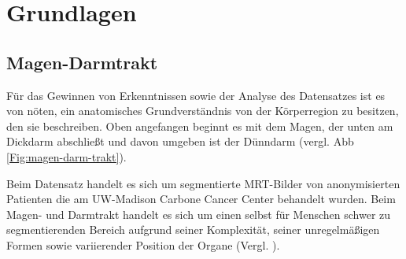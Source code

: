 \section{Grundlagen}\raggedbottom

\subsection{Magen-Darmtrakt}

Für das Gewinnen von Erkenntnissen sowie der Analyse des Datensatzes ist es von nöten, ein anatomisches Grundverständnis von der Körperregion zu besitzen, den sie beschreiben. Oben angefangen beginnt es mit dem Magen, der unten am Dickdarm abschließt und davon umgeben ist der Dünndarm (vergl. Abb \ref{Fig:magen-darm-trakt}). 

Beim Datensatz handelt es sich um segmentierte MRT-Bilder von anonymisierten Patienten die am UW-Madison Carbone Cancer Center behandelt wurden. Beim Magen- und Darmtrakt handelt es sich um einen selbst für Menschen schwer zu segmentierenden Bereich aufgrund seiner Komplexität, seiner unregelmäßigen Formen sowie variierender Position der Organe (Vergl. \cite{Chen_2020}).

